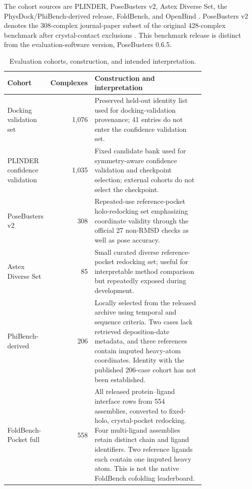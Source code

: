 \documentclass{article}
\newcommand{\citep}[1]{\cite{#1}}
\begin{document}
The cohort sources are PLINDER, PoseBusters v2, Astex Diverse Set, the PhysDock/PhiBench-derived release, FoldBench, and OpenBind \citep{durairaj2024plinder,buttenschoen2024posebusters,hartshorn2007astex,zhang2025physdock,xu2026foldbench,openbind2026eva71}.
PoseBusters v2 denotes the 308-complex journal-paper subset of the original 428-complex benchmark after crystal-contact exclusions \citep{buttenschoen2024posebusters,abramson2024alphafold3}. This benchmark release is distinct from the evaluation-software version, PoseBusters 0.6.5.

\begin{table}[htbp]
    \centering
    \small
    \caption{Evaluation cohorts, construction, and intended interpretation.}
    \label{tab:si_cohorts}
    \begin{tabular}{>{\raggedright\arraybackslash}p{0.20\linewidth}r>{\raggedright\arraybackslash}p{0.60\linewidth}}
        \toprule
        Cohort & Complexes & Construction and interpretation \\
        \midrule
        Docking validation set & 1,076 & Preserved held-out identity list used for docking-validation provenance; 41 entries do not enter the confidence validation set. \\
        PLINDER confidence validation & 1,035 & Fixed candidate bank used for symmetry-aware confidence validation and checkpoint selection; external cohorts do not select the checkpoint. \\
        PoseBusters v2 & 308 & Repeated-use reference-pocket holo-redocking set emphasizing coordinate validity through the official 27 non-RMSD checks as well as pose accuracy. \\
        Astex Diverse Set & 85 & Small curated diverse reference-pocket redocking set; useful for interpretable method comparison but repeatedly exposed during development. \\
        PhiBench-derived & 206 & Locally selected from the released archive using temporal and sequence criteria. Two cases lack retrieved deposition-date metadata, and three references contain imputed heavy-atom coordinates. Identity with the published 206-case cohort has not been established. \\
        FoldBench-Pocket full & 558 & All released protein--ligand interface rows from 554 assemblies, converted to fixed-holo, crystal-pocket redocking. Four multi-ligand assemblies retain distinct chain and ligand identifiers. Two reference ligands each contain one imputed heavy atom. This is not the native FoldBench cofolding leaderboard. \\

\end{tabular}
\end{table}
\end{document}
